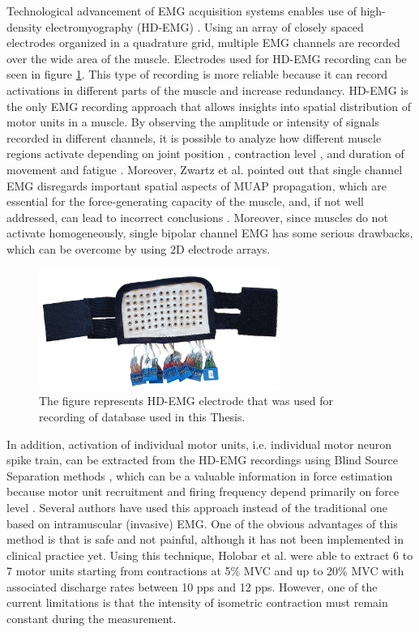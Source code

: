 Technological advancement of EMG acquisition systems enables use of high-density electromyography (HD-EMG) \citep{Zwarts2004}. Using an array of closely spaced electrodes organized in a quadrature grid, multiple EMG channels are recorded over the wide area of the muscle. Electrodes used for HD-EMG recording can be seen in figure \ref{fig:electrode}. This type of recording is more reliable because it can record activations in different parts of the muscle and increase redundancy. HD-EMG is the only EMG recording approach that allows insights into spatial distribution of motor units in a muscle. By observing the amplitude or intensity of signals recorded in different channels, it is possible to analyze how different muscle regions activate depending on joint position \citep{Vieira2010}, contraction level \citep{Holtermann2005}, and duration of movement and fatigue \citep{Tucker2009, Staudenmann2014}. Moreover, Zwartz et al. pointed out that single channel EMG disregards important spatial aspects of MUAP propagation, which are essential for the force-generating capacity of the muscle, and, if not well addressed, can lead to incorrect conclusions \citep{Zwarts2003}. Moreover, since muscles do not activate homogeneously, single bipolar channel EMG has some serious drawbacks, which can be overcome by using 2D electrode arrays. 
\begin{figure}[ht]
\centering
\includegraphics[width=0.7\textwidth]{Images/introduction/electrode2.png}
\caption{The figure represents HD-EMG electrode that was used for recording of database used in this Thesis.}
\label{fig:electrode}
\end{figure}

In addition, activation of individual motor units, i.e. individual motor neuron spike train, can be extracted from the HD-EMG recordings using Blind Source Separation methods \citep{Holobar2007, Holobar2010}, which can be a valuable information in force estimation because motor unit recruitment and firing frequency depend primarily on force level \citep{Merletti-book}. Several authors have used this approach instead of the traditional one based on intramuscular (invasive) EMG. One of the obvious advantages of this method is that is safe and not painful, although it has not been implemented in clinical practice yet. Using this technique, Holobar et al.  \citep{Holobar2010} were able to extract 6 to 7 motor units starting from contractions at 5\% MVC and up to 20\% MVC with associated discharge rates between 10 pps and 12 pps. However, one of the current limitations is that the intensity of isometric contraction must remain constant during the measurement.

